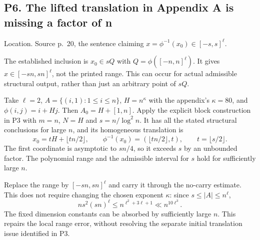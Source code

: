 \documentclass[10pt]{article}
\begin{document}
\subsection*{P6. The lifted translation in Appendix A is missing a factor of n}
Location. Source p. 20, the sentence claiming \(x=\phi^{-1}(x_0)\in[-s,s]^\ell\).\par
The established inclusion is \(x_0\in sQ\) with \(Q=\phi([-n,n]^\ell)\). It gives \(x\in[-sn,sn]^\ell\), not the printed range. This can occur for actual admissible structural output, rather than just an arbitrary point of \(sQ\).\par
Take \(\ell=2\), \(A=\{(i,1):1\le i\le n\}\), \(H=n^\kappa\) with the appendix’s \(\kappa=80\), and \(\phi(i,j)=i+Hj\). Then \(A_0=H+[1,n]\). Apply the explicit block construction in P3 with \(m=n\), \(N=H\) and \(s=n/\log^2n\). It has all the stated structural conclusions for large \(n\), and its homogeneous translation is \[x_0=tH+\lfloor tn/2\rfloor,\qquad
 \phi^{-1}(x_0)=(\lfloor tn/2\rfloor,t),\qquad t=\lfloor s/2\rfloor.\] The first coordinate is asymptotic to \(sn/4\), so it exceeds \(s\) by an unbounded factor. The polynomial range and the admissible interval for \(s\) hold for sufficiently large \(n\).\par
Replace the range by \([-sn,sn]^\ell\) and carry it through the no-carry estimate. This does not require changing the chosen exponent \(\kappa\): since \(s\le |A|\le n^\ell\), \[ns^2(sn)^\ell\le n^{\ell^2+3\ell+1}\ll n^{10\ell^3}.\] The fixed dimension constants can be absorbed by sufficiently large \(n\). This repairs the local range error, without resolving the separate initial translation issue identified in P3.\par
\end{document}
